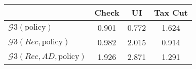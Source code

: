 \begin{tabular}{@{}lccc@{}} 
\toprule 
                          & Check      & UI    & Tax Cut    \\  \midrule 
$\mathcal{G}3(\text{policy})$ & 0.901  & 0.772  & 1.624     \\ 
$\mathcal{G}3(Rec,\text{policy})$ & 0.982  & 2.015  & 0.914     \\ 
$\mathcal{G}3(Rec, AD,\text{policy})$ & 1.926  & 2.871  & 1.291     \\ 
\end{tabular}  
